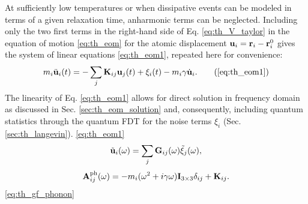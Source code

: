 At sufficiently low temperatures or when dissipative events can be modeled in terms of a given relaxation time, anharmonic terms can be neglected. Including only the two first terms in the right-hand side of Eq. \eqref{eq:th_V_taylor} in the equation of motion \eqref{eq:th_eom} for the atomic displacement $\mathbf{u}_i=\mathbf{r}_i-\mathbf{r}_i^0$ gives the system of linear equations \eqref{eq:th_eom1}, repeated here for convenience:
\begin{equation}
 m_i \ddot{\bu}_i(t) =  - \sum_j \bb{K}_{ij}\bb{u}_j(t) + \xi_i(t) - m_i \gamma \dot{\bu}_i.  \tag{\ref{eq:th_eom1}}
\end{equation}
The linearity of Eq. \eqref{eq:th_eom1} allows for direct solution in frequency domain as discussed in Sec. \ref{sec:th_eom_solution} and, consequently, including quantum statistics through the quantum FDT for the noise terms $\xi_i$ (Sec. \ref{sec:th_langevin}).  \eqref{eq:th_eom1} 
 \begin{equation}
 \tilde {\mathbf{u}}_i(\omega) =  \sum_j \mathbf{G}_{ij}(\omega) \tilde{\xi}_j(\omega) , \label{eq:th_gf_phonon}
\end{equation}
\begin{equation}
 \mathbf{A}_{ij}^{\textrm{ph}}(\omega)= -m_i(\omega^2+i\gamma\omega) \mathbf{I}_{3 \times 3} \delta_{ij} + \mathbf{K}_{ij} .
\end{equation}
\eqref{eq:th_gf_phonon} 


